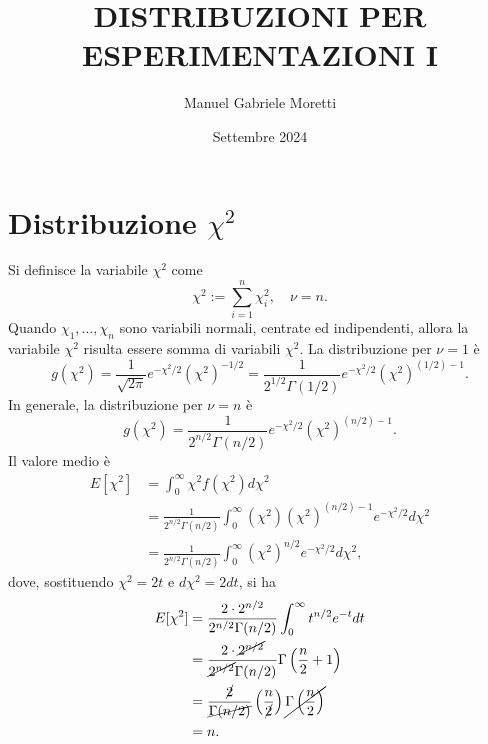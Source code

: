 \documentclass{article}
\title{\textbf{DISTRIBUZIONI PER ESPERIMENTAZIONI I}}
\author{Manuel Gabriele Moretti}
\date{Settembre 2024}
\theoremstyle{remark}
\begin{document}
\maketitle
\tableofcontents
\newpage

\section{Distribuzione \texorpdfstring{$\chi^2$}{chi-quadro}}
Si definisce la variabile $\chi^2$ come
\begin{equation}
    \chi^2 := \sum_{i=1}^n\chi_i^2,\quad \nu = n.
\end{equation}
Quando $\chi_1,\dots,\chi_n$ sono variabili normali, centrate ed indipendenti, allora la variabile $\chi^2$ risulta essere somma di variabili $\chi^2$. La distribuzione per $\nu = 1$ è
\begin{equation}
    g(\chi^2) = \frac{1}{\sqrt{2\pi}}e^{-\chi^2/2}(\chi^2)^{-1/2} = \frac{1}{2^{1/2}\Gamma(1/2)}e^{-\chi^2/2}(\chi^2)^{(1/2) - 1}.
\end{equation}
In generale, la distribuzione per $\nu = n$ è
\begin{equation}
    g(\chi^2) = \frac{1}{2^{n/2}\Gamma(n/2)}e^{-\chi^2/2}(\chi^2)^{(n/2) - 1}.
\end{equation}
Il valore medio è
\begin{equation}
    \begin{split}
        E[\chi^2]&=\int_0^\infty\chi^2f(\chi^2)d\chi^2 \\
        &=\frac{1}{2^{n/2}\Gamma(n/2)}\int_0^\infty(\chi^2)(\chi^2)^{(n/2) - 1}e^{-\chi^2/2}d\chi^2 \\
        &=\frac{1}{2^{n/2}\Gamma(n/2)}\int_0^\infty(\chi^2)^{n/2}e^{-\chi^2/2}d\chi^2,
    \end{split}
\end{equation}
dove, sostituendo $\chi^2=2t$ e $d\chi^2=2dt$, si ha
\begin{equation}
    \begin{split}
        E[\chi^2] &=\frac{2\cdot2^{n/2}}{2^{n/2}\Gamma(n/2)}\int_0^\infty t^{n/2}e^{-t}dt \\
        &=\frac{2\cdot\cancel{2^{n/2}}}{\cancel{2^{n/2}}\Gamma(n/2)}\Gamma\left(\frac{n}{2}+1\right)\\
        &=\frac{\cancel{2}}{\cancel{\Gamma(n/2)}}\left(\frac{n}{\cancel{2}}\right)\cancel{\Gamma\left(\frac{n}{2}\right)} \\
        &=n.
    \end{split}
\end{equation}
\end{document}
